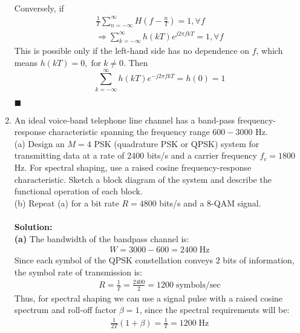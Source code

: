 \documentclass[a4paper,12pt]{article}
\begin{document}
\begin{enumerate}
\begin{align*}
            \end{align*}
            Conversely, if
            \begin{align*}
                \frac{1}{T} \sum_{n = -\infty}^{\infty} H(f - \frac{n}{T}) = 1, \forall f \\
                \Rightarrow \sum_{k = -\infty}^{\infty} h(kT) e^{j2\pi fkT} = 1, \forall f
            \end{align*}
            This is possible only if the left-hand side has no dependence on $f$, which means $h(kT) = 0, \; \text{for} \; k \neq 0$. Then $$\sum_{k = -\infty}^{\infty} h(kT) e^{-j2\pi fkT} = h(0) = 1$$
            \begin{flushright}
                $\blacksquare$
            \end{flushright}
        \item 
            An ideal voice-band telephone line channel has a band-pass frequency-response characteristic spanning the frequency range $600-3000$ Hz. \\ 
            (a) Design an $M = 4$ PSK (quadrature PSK or QPSK) system for transmitting data at a rate of 2400 bits/s and a carrier frequency $f_c = 1800$ Hz. For spectral shaping, use a raised cosine frequency-response characteristic. Sketch a block diagram of the system and describe the functional operation of each block. \\
            (b) Repeat (a) for a bit rate $R = 4800$ bits/s and a $8$-QAM signal. \\ \\ 
            \textbf{Solution:} \\
            \textbf{(a)} 
            The bandwidth of the bandpass channel is: 
            \begin{align*}
                W = 3000 - 600 = 2400 \; \text{Hz}
            \end{align*}
            Since each symbol of the QPSK constellation conveys $2$ bits of information, the symbol rate of transmission is: 
            \begin{align*}
                R = \frac{1}{T} = \frac{2400}{2} = 1200 \; \text{symbols/sec}
            \end{align*}
            Thus, for spectral shaping we can use a signal pulse with a raised cosine spectrum and roll-off factor $\beta = 1$, since the spectral requirements will be:
            \begin{align*}
                \frac{1}{2T} (1 + \beta) = \frac{1}{T} = 1200 \; \text{Hz}

\end{align*}
\end{enumerate}
\end{document}
